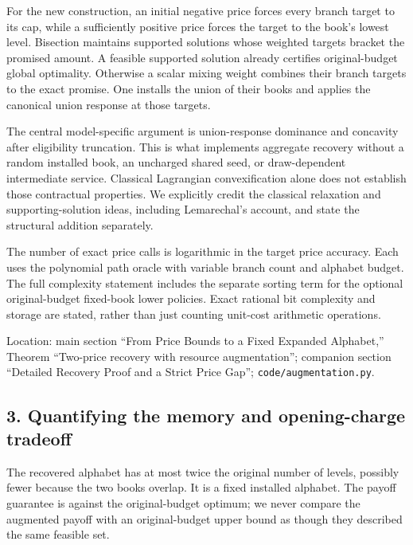 \documentclass[11pt,letterpaper]{article}
\begin{document}
For the new construction, an initial negative price forces every branch target to its cap, while a sufficiently positive price forces the target to the book's lowest level. Bisection maintains supported solutions whose weighted targets bracket the promised amount. A feasible supported solution already certifies original-budget global optimality. Otherwise a scalar mixing weight combines their branch targets to the exact promise. One installs the union of their books and applies the canonical union response at those targets.



The central model-specific argument is union-response dominance and concavity after eligibility truncation. This is what implements aggregate recovery without a random installed book, an uncharged shared seed, or draw-dependent intermediate service. Classical Lagrangian convexification alone does not establish those contractual properties. We explicitly credit the classical relaxation and supporting-solution ideas, including Lemarechal's account, and state the structural addition separately.



The number of exact price calls is logarithmic in the target price accuracy. Each uses the polynomial path oracle with variable branch count and alphabet budget. The full complexity statement includes the separate sorting term for the optional original-budget fixed-book lower policies. Exact rational bit complexity and storage are stated, rather than just counting unit-cost arithmetic operations.



Location: main section “From Price Bounds to a Fixed Expanded Alphabet,” Theorem “Two-price recovery with resource augmentation”; companion section “Detailed Recovery Proof and a Strict Price Gap”; \nolinkurl{code/augmentation.py}.



\subsection*{3. Quantifying the memory and opening-charge tradeoff}


The recovered alphabet has at most twice the original number of levels, possibly fewer because the two books overlap. It is a fixed installed alphabet. The payoff guarantee is against the original-budget optimum; we never compare the augmented payoff with an original-budget upper bound as though they described the same feasible set.
\end{document}
